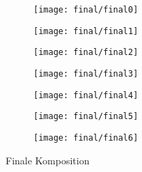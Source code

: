 \begin{figure}[htbp]
	\centering
		    \begin{adjustbox}{margin=-20mm 0mm 0mm 0.2mm}
		    	
	\begin{subfigure}[b]{0.19\textwidth}
		\centering
		\texttt{[image: final/final0]} %
		\caption{}
	\end{subfigure}
	\begin{subfigure}[b]{0.19\textwidth}
		\centering
		\texttt{[image: final/final1]} %
		\caption{}
	\end{subfigure}
	\begin{subfigure}[b]{0.19\textwidth}
		\centering
		\texttt{[image: final/final2]} %
		\caption{}
	\end{subfigure}
	\begin{subfigure}[b]{0.19\textwidth}
		\centering
		\texttt{[image: final/final3]} %
		\caption{}
	\end{subfigure}
	\begin{subfigure}[b]{0.19\textwidth}
		\centering
		\texttt{[image: final/final4]} %
		\caption{}
	\end{subfigure}
	\begin{subfigure}[b]{0.19\textwidth}
		\centering
		\texttt{[image: final/final5]} %
		\caption{}
	\end{subfigure}
	\begin{subfigure}[b]{0.19\textwidth}
		\centering
		\texttt{[image: final/final6]} %
		\caption{}
	\end{subfigure}
			    \end{adjustbox}
			    
	\caption{Finale Komposition}
	\label{fig:final}
\end{figure}


